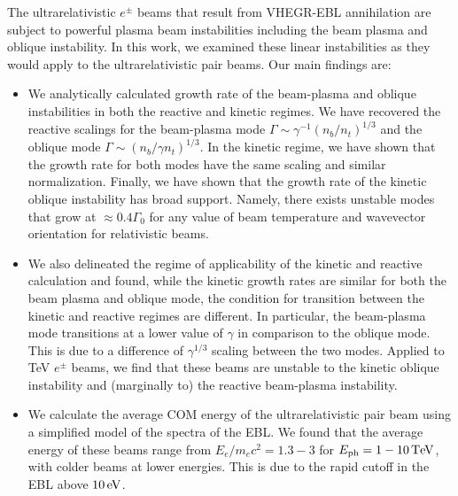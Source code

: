 \documentclass[usenatbib,iop,apj,numberedappendix]{aeb_emulateapj_2015}
\def\eV{{\rm eV}} %
\def\TeV{{\rm T}\eV} %
\newcommand{\epm}{\ensuremath{e^{\pm}}}
\begin{document}
The ultrarelativistic $\epm$ beams that result from VHEGR-EBL annihilation are subject to powerful plasma beam instabilities including the beam plasma and oblique instability.  In this work, we examined these linear instabilities as they would apply to the ultrarelativistic pair beams.  Our main findings are:
\begin{itemize}
\item{We analytically calculated growth rate of the beam-plasma and oblique instabilities in both the reactive and kinetic regimes.  We have recovered the reactive scalings for the beam-plasma mode $\Gamma \sim \gamma^{-1}(n_b/n_t)^{1/3}$ and the oblique mode $\Gamma \sim (n_b/\gamma n_t)^{1/3}$.  In the kinetic regime, we have shown that the growth rate for both modes have the same scaling and similar normalization.  Finally, we have shown that the growth rate of the kinetic oblique instability has broad support. Namely, there exists unstable modes that grow at $\approx 0.4\Gamma_0$ for any value of beam temperature and wavevector orientation for relativistic beams.}
\item{We also delineated the regime of applicability of the kinetic and reactive calculation and found, while the kinetic growth rates are similar for both the beam plasma and oblique mode, the condition for transition between the kinetic and reactive regimes are different.  In particular, the beam-plasma mode transitions at a lower value of $\gamma$ in comparison to the oblique mode.  This is due to a difference of $\gamma^{1/3}$ scaling between the two modes.  Applied to TeV $e^{\pm}$ beams, we find that these beams are unstable to the kinetic oblique instability and (marginally to) the reactive beam-plasma instability.}
\item{We calculate the average COM energy of the ultrarelativistic pair beam using a simplified model of the spectra of the EBL.  We found that the average energy of these beams range from $E_e/m_e c^2 = 1.3-3$ for $E_{\rm ph} = 1-10\,\TeV$, with colder beams at lower energies.  This is due to the rapid cutoff in the EBL above $10\,\eV$. }
\end{itemize}
\end{document}

